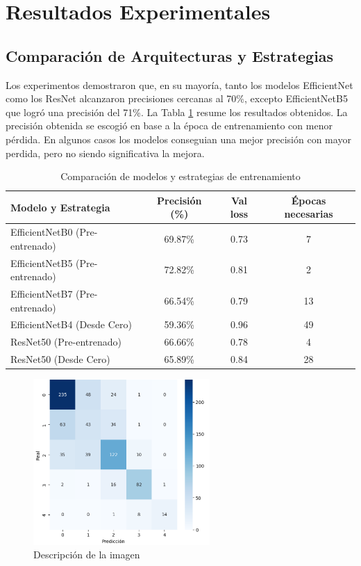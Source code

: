 \documentclass[11pt,spanish,listoffigures,listoftables]{tfgetsinf}
\begin{document}
\section{Resultados Experimentales}

\subsection{Comparación de Arquitecturas y Estrategias}
Los experimentos demostraron que, en su mayoría, tanto los modelos EfficientNet como los ResNet alcanzaron precisiones cercanas al 70\%, excepto EfficientNetB5 que logró una precisión del 71\%. La Tabla \ref{tab:resultados_experimentos} resume los resultados obtenidos.
La precisión obtenida se escogió en base a la época de entrenamiento con menor pérdida. En algunos casos los modelos conseguian una mejor precisión con mayor perdida, pero no siendo significativa la mejora.
\begin{table}[htbp]
\centering
\begin{tabular}{lccc}
\toprule
\textbf{Modelo y Estrategia} & \textbf{Precisión (\%)} & \textbf{Val loss} & \textbf{Épocas necesarias} \\
\midrule
EfficientNetB0 (Pre-entrenado)  & 69.87\%    & 0.73 & 7 \\
EfficientNetB5 (Pre-entrenado)  & 72.82\%    & 0.81 & 2 \\
EfficientNetB7 (Pre-entrenado)  & 66.54\%    & 0.79 & 13 \\
EfficientNetB4 (Desde Cero)     & 59.36\%    & 0.96 & 49 \\
ResNet50 (Pre-entrenado)        & 66.66\%    & 0.78 & 4 \\
ResNet50 (Desde Cero)           & 65.89\%    & 0.84 & 28 \\

\bottomrule
\end{tabular}
\caption{Comparación de modelos y estrategias de entrenamiento}
\label{tab:resultados_experimentos}
\end{table}

\begin{figure}[htbp]
    \centering
    \includegraphics[width=0.6\textwidth]{EfficientNet_B7.png}
    \caption{Descripción de la imagen}
    \label{fig:matriz_confusion}
\end{figure}
\end{document}
